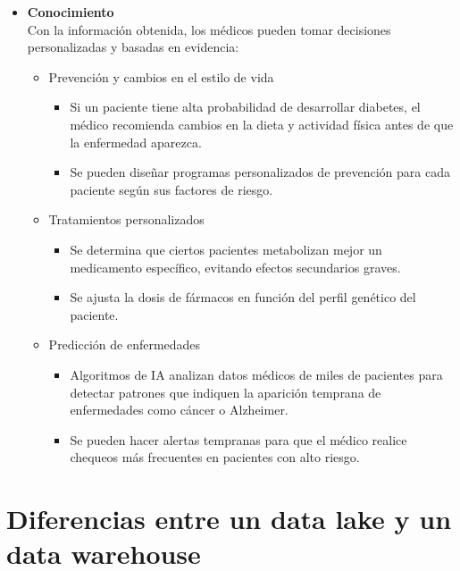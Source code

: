 \documentclass[12pt]{article}
\begin{document}
\begin{itemize}
    \item \textbf{Conocimiento}
    \\
    Con la información obtenida, los médicos pueden tomar decisiones personalizadas y basadas en evidencia:
    \begin{itemize}
        \item Prevención y cambios en el estilo de vida
            \begin{itemize}
                \item Si un paciente tiene alta probabilidad de desarrollar diabetes, el médico recomienda cambios en la dieta y 
                actividad física antes de que la enfermedad aparezca.
                \item Se pueden diseñar programas personalizados de prevención para cada paciente según sus factores de riesgo.
            \end{itemize}
        \item Tratamientos personalizados
            \begin{itemize}
                \item Se determina que ciertos pacientes metabolizan mejor un medicamento específico, evitando efectos 
                secundarios graves.
                \item Se ajusta la dosis de fármacos en función del perfil genético del paciente.
            \end{itemize}
        \item Predicción de enfermedades
            \begin{itemize}
                \item Algoritmos de IA analizan datos médicos de miles de pacientes para detectar patrones que indiquen 
                la aparición temprana de enfermedades como cáncer o Alzheimer.
                \item Se pueden hacer alertas tempranas para que el médico realice chequeos más frecuentes en pacientes con 
                alto riesgo.
            \end{itemize}
    \end{itemize}
\end{itemize}

\clearpage
\section{Diferencias entre un data lake y un data warehouse}

\renewcommand{\arraystretch}{2} %
\end{document}
